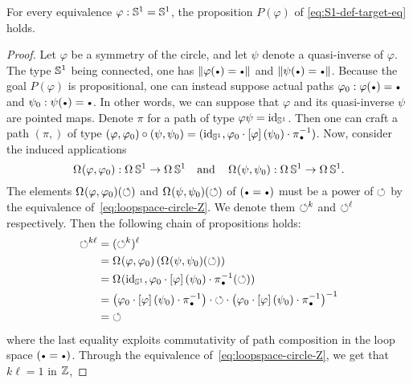\documentclass[english,a4paper]{lmcs}
\begin{document}
\begin{prop}
  \label{prop:S1-eq-either}%
  For every equivalence $\varphi:{{\mathbb S^{1}}}={{\mathbb S^{1}}}$, the proposition
  $P(\varphi)$ of \cref{eq:S1-def-target-eq} holds.
\end{prop}
\begin{proof}
  Let $\varphi$ be a symmetry of the circle, and let $\psi$ denote a
  quasi-inverse of $\varphi$. The type ${{\mathbb S^{1}}}$ being connected, one
  has $\Trunc{\varphi(\base) = \base}$ and
  $\Trunc{\psi(\base) = \base}$. Because the goal $P(\varphi)$ is
  propositional, one can instead suppose actual paths
  $\varphi_0\from \varphi(\base) = \base$ and
  $\psi_0\from \psi(\base) = \base$. In other words, we can suppose that
  $\varphi$ and its quasi-inverse $\psi$ are pointed maps. Denote
  $\pi$ for a path of type $\varphi\psi = \mathord{\mathrm{id}}_{{\mathbb S^{1}}}$. Then one can craft a
  path $(\pi,)$ of type
  $(\varphi,\varphi_0) \circ (\psi,\psi_0) =
  (\id_\Sc, \varphi_0 \cdot \ap \varphi (\psi_0) \cdot \inv {\pi_{\base}})$. Now, consider the
  induced applications
  \begin{displaymath}
    \mathop{\Omega^{}} (\varphi,\varphi_0) : \mathop{\Omega^{}} {{\mathbb S^{1}}} \to \mathop{\Omega^{}} {{\mathbb S^{1}}}
    \quad\text{and}\quad
    \mathop{\Omega^{}} (\psi,\psi_0) : \mathop{\Omega^{}} {{\mathbb S^{1}}} \to \mathop{\Omega^{}} {{\mathbb S^{1}}}.
  \end{displaymath}
  The elements $\mathop{\Omega^{}} (\varphi,\varphi_0) (\mathord{\circlearrowleft})$ and
  $\mathop{\Omega^{}} (\psi,\psi_0) (\mathord{\circlearrowleft})$ of $(\base=\base)$ must be a
  power of $\mathord{\circlearrowleft}$ by the equivalence
  of~\cref{eq:loopspace-circle-Z}. We denote them $\mathord{\circlearrowleft}^k$ and
  $\mathord{\circlearrowleft}^\ell$ respectively. Then the following chain of propositions
  holds:
  \begin{align*}
    \Sloop^{k\ell} &= (\Sloop^k)^\ell\\
    &= \loopspace{} (\varphi,\varphi_0) \left(
      \loopspace{} (\psi,\psi_0) (\Sloop)
    \right)\\
    &= \loopspace{} (\id_\Sc,
    \varphi_0 \cdot \ap \varphi (\psi_0) \cdot \inv {\pi_{\base}} (\Sloop))
    \\
    &=
    \left( \varphi_0 \cdot \ap \varphi (\psi_0) \cdot \inv {\pi_{\base}} \right)
    \cdot \Sloop \cdot
    \inv {\left( \varphi_0 \cdot \ap \varphi (\psi_0) \cdot \inv {\pi_{\base}} \right)}
    \\
    &= \Sloop
  \end{align*}
  where the last equality exploits commutativity of path composition
  in the loop space $(\base = \base)$. Through the equivalence
  of~\cref{eq:loopspace-circle-Z}, we get that $k\ell=1$ in $\mathbb{Z}$,

\end{proof}
\end{document}
